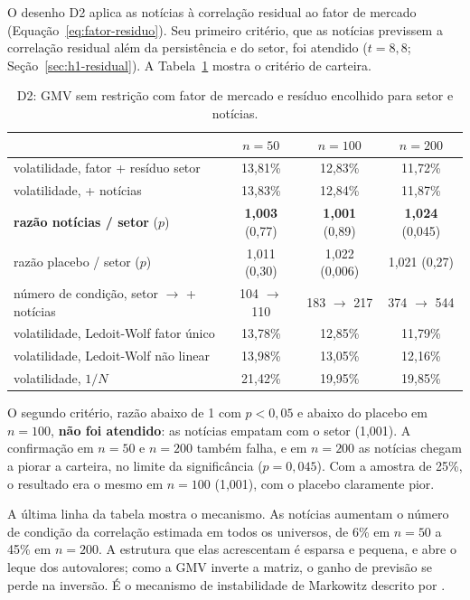 O desenho D2 aplica as notícias à correlação residual ao fator de mercado
(Equação~\eqref{eq:fator-residuo}). Seu primeiro critério, que as notícias previssem a correlação residual
além da persistência e do setor, foi atendido ($t=8{,}8$; Seção~\ref{sec:h1-residual}). A
Tabela~\ref{tab:d2} mostra o critério de carteira.

\begin{table}[htbp]
\centering
\small
\caption{D2: GMV sem restrição com fator de mercado e resíduo encolhido para setor e notícias.}
\label{tab:d2}
\begin{tabular}{lccc}
\toprule
& $n=50$ & $n=100$ & $n=200$ \\
\midrule
volatilidade, fator + resíduo setor & 13,81\% & 12,83\% & 11,72\% \\
volatilidade, + notícias & 13,83\% & 12,84\% & 11,87\% \\
\textbf{razão notícias / setor} ($p$) & \textbf{1,003} (0,77) & \textbf{1,001} (0,89) & \textbf{1,024} (0,045) \\
razão placebo / setor ($p$) & 1,011 (0,30) & 1,022 (0,006) & 1,021 (0,27) \\
número de condição, setor $\to$ + notícias & 104 $\to$ 110 & 183 $\to$ 217 & 374 $\to$ 544 \\
\midrule
volatilidade, Ledoit-Wolf fator único & 13,78\% & 12,85\% & 11,79\% \\
volatilidade, Ledoit-Wolf não linear & 13,98\% & 13,05\% & 12,16\% \\
volatilidade, $1/N$ & 21,42\% & 19,95\% & 19,85\% \\
\bottomrule
\end{tabular}
\end{table}

O segundo critério, razão abaixo de 1 com $p<0{,}05$ e abaixo do placebo em $n=100$, \textbf{não foi
atendido}: as notícias empatam com o setor (1,001). A confirmação em $n=50$ e $n=200$ também falha, e em
$n=200$ as notícias chegam a piorar a carteira, no limite da significância ($p=0{,}045$). Com a amostra de
25\%, o resultado era o mesmo em $n=100$ (1,001), com o placebo claramente pior.

A última linha da tabela mostra o mecanismo. As notícias aumentam o número de condição da correlação
estimada em todos os universos, de 6\% em $n=50$ a 45\% em $n=200$. A estrutura que elas acrescentam é
esparsa e pequena, e abre o leque dos autovalores; como a GMV inverte a matriz, o ganho de previsão se
perde na inversão. É o mecanismo de instabilidade de Markowitz descrito por \citet{lopezdeprado2016}.

